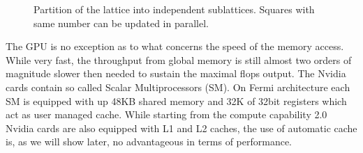 \documentclass[a4paper]{llncs}
\def\neighborhood{--
  ++(0,-0.5)-- ++(1,0)-- ++(0,-0.5)-- ++(0,-0.5)-- ++(1,0)--
  ++(0,-1.0)-- ++(1,0)-- ++(0,1.0)-- ++(1,0)-- ++(0,1.0)-- ++(1,0)--
  ++(0,1)-- ++(-1,0)-- ++(0,1)-- ++(-1,0)-- ++(0,1)-- ++(-1,0)-- ++(0,-1)--
  ++(-1,0)-- ++(0,-1)-- ++(-1,0)-- ++(0,-0.6)}
\def\bksize{8}
\begin{document}
\begin{figure}
\begin{center} 
\end{center}
\caption{\label{fig:part}Partition of the lattice into independent
  sublattices. Squares with same number can be updated in parallel.}
\end{figure}



The GPU is no exception as to what concerns the speed of the memory
access.  While very fast, the throughput from global memory is still
almost two orders of magnitude slower then needed to sustain the
maximal flops output.  The Nvidia cards contain so called { Scalar
  Multiprocessors} (SM). On Fermi architecture each SM is equipped
with up 48KB shared memory and 32K of 32bit registers\cite{Fermi}
which act as user managed cache. While starting from the compute
capability 2.0 Nvidia cards are also equipped with L1 and L2 caches,
the use of automatic cache is, as we will show later, no advantageous
in terms of performance.
\end{document}
